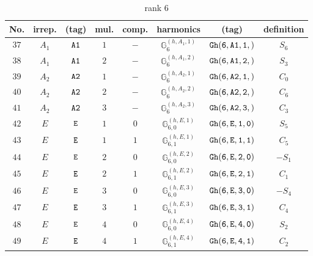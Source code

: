 \documentclass[fleqn,8pt]{jsarticle}
\begin{document}
\begin{table}[ht!]
\begin{center}
\caption{rank 6}
\renewcommand{\arraystretch}{1.3}
\begin{tabular}{cccccccc} \hline \hline
No. & irrep. & (tag) & mul. & comp. & harmonics & (tag) & definition \\ \hline
$ 37 $ & $ A_{1} $ & $ {\tt A1} $ & $ 1 $ & $ - $ & $ \mathbb{G}_{6}^{(h,A_{1},1)} $ & $ {\tt Gh(6,A1,1,)} $ & $ S_{6} $ \\
$ 38 $ & $ A_{1} $ & $ {\tt A1} $ & $ 2 $ & $ - $ & $ \mathbb{G}_{6}^{(h,A_{1},2)} $ & $ {\tt Gh(6,A1,2,)} $ & $ S_{3} $ \\
$ 39 $ & $ A_{2} $ & $ {\tt A2} $ & $ 1 $ & $ - $ & $ \mathbb{G}_{6}^{(h,A_{2},1)} $ & $ {\tt Gh(6,A2,1,)} $ & $ C_{0} $ \\
$ 40 $ & $ A_{2} $ & $ {\tt A2} $ & $ 2 $ & $ - $ & $ \mathbb{G}_{6}^{(h,A_{2},2)} $ & $ {\tt Gh(6,A2,2,)} $ & $ C_{6} $ \\
$ 41 $ & $ A_{2} $ & $ {\tt A2} $ & $ 3 $ & $ - $ & $ \mathbb{G}_{6}^{(h,A_{2},3)} $ & $ {\tt Gh(6,A2,3,)} $ & $ C_{3} $ \\
$ 42 $ & $ E $ & $ {\tt E} $ & $ 1 $ & $ 0 $ & $ \mathbb{G}_{6,0}^{(h,E,1)} $ & $ {\tt Gh(6,E,1,0)} $ & $ S_{5} $ \\
$ 43 $ & $ E $ & $ {\tt E} $ & $ 1 $ & $ 1 $ & $ \mathbb{G}_{6,1}^{(h,E,1)} $ & $ {\tt Gh(6,E,1,1)} $ & $ C_{5} $ \\
$ 44 $ & $ E $ & $ {\tt E} $ & $ 2 $ & $ 0 $ & $ \mathbb{G}_{6,0}^{(h,E,2)} $ & $ {\tt Gh(6,E,2,0)} $ & $ - S_{1} $ \\
$ 45 $ & $ E $ & $ {\tt E} $ & $ 2 $ & $ 1 $ & $ \mathbb{G}_{6,1}^{(h,E,2)} $ & $ {\tt Gh(6,E,2,1)} $ & $ C_{1} $ \\
$ 46 $ & $ E $ & $ {\tt E} $ & $ 3 $ & $ 0 $ & $ \mathbb{G}_{6,0}^{(h,E,3)} $ & $ {\tt Gh(6,E,3,0)} $ & $ - S_{4} $ \\
$ 47 $ & $ E $ & $ {\tt E} $ & $ 3 $ & $ 1 $ & $ \mathbb{G}_{6,1}^{(h,E,3)} $ & $ {\tt Gh(6,E,3,1)} $ & $ C_{4} $ \\
$ 48 $ & $ E $ & $ {\tt E} $ & $ 4 $ & $ 0 $ & $ \mathbb{G}_{6,0}^{(h,E,4)} $ & $ {\tt Gh(6,E,4,0)} $ & $ S_{2} $ \\
$ 49 $ & $ E $ & $ {\tt E} $ & $ 4 $ & $ 1 $ & $ \mathbb{G}_{6,1}^{(h,E,4)} $ & $ {\tt Gh(6,E,4,1)} $ & $ C_{2} $ \\
 \hline \hline
\end{tabular}
\end{center}
\end{table}
\end{document}
